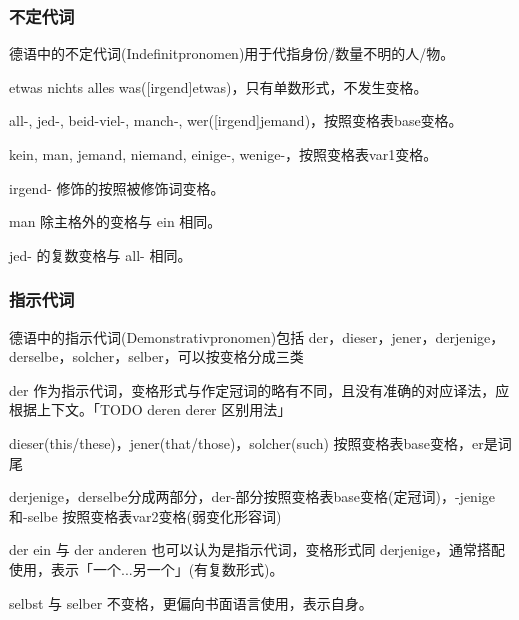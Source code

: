 \subsubsection{不定代词}

德语中的不定代词(Indefinitpronomen)用于代指身份/数量不明的人/物。

etwas nichts alles was([irgend]etwas)，只有单数形式，不发生变格。

all-, jed-, beid-viel-, manch-, wer([irgend]jemand)，按照变格表base变格。

kein, man, jemand, niemand, einige-, wenige-，按照变格表var1变格。

irgend- 修饰的按照被修饰词变格。

man 除主格外的变格与 ein 相同。

jed- 的复数变格与 all- 相同。

\subsubsection{指示代词}

德语中的指示代词(Demonstrativpronomen)包括 der，dieser，jener，derjenige，derselbe，solcher，selber，可以按变格分成三类

der 作为指示代词，变格形式与作定冠词的略有不同，且没有准确的对应译法，应根据上下文。「TODO deren derer 区别用法」

dieser(this/these)，jener(that/those)，solcher(such) 按照变格表base变格，er是词尾

derjenige，derselbe分成两部分，der-部分按照变格表base变格(定冠词)，-jenige和-selbe 按照变格表var2变格(弱变化形容词)

der ein 与 der anderen 也可以认为是指示代词，变格形式同 derjenige，通常搭配使用，表示「一个...另一个」(有复数形式)。

selbst 与 selber 不变格，更偏向书面语言使用，表示自身。

